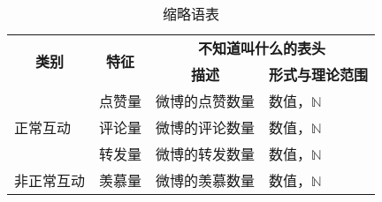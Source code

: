 \documentclass[../main.tex]{subfiles}
\begin{document}

\begin{table}[!htbp]
  \centering
  \begin{tabular}{l|l|l|l}
		\hline
        \multicolumn{1}{c|}{\multirow{2}{*}{\textbf{类别}}} & \multicolumn{1}{c|}{\multirow{2}{*}{\textbf{特征}}} & \multicolumn{2}{c}{\textbf{不知道叫什么的表头}} \\
        \cline{3-4}
         & & \multicolumn{1}{c|}{\textbf{描述}} & \multicolumn{1}{c}{\textbf{形式与理论范围}} \\
		\hline
        \multirow{3}{*}{正常互动} & 点赞量 & 微博的点赞数量 & 数值，$\mathbb{N}$ \\
		\cline{2-4}
         & 评论量 & 微博的评论数量 & 数值，$\mathbb{N}$ \\
		\cline{2-4}
         & 转发量 & 微博的转发数量 & 数值，$\mathbb{N}$ \\
		\hline
        非正常互动 & 羡慕量 & 微博的羡慕数量 & 数值，$\mathbb{N}$ \\
    \hline
  \end{tabular}
  \renewcommand{\arraystretch}{1.38}%
  \setlength{\abovecaptionskip}{0pt}%
  \setlength{\belowcaptionskip}{10pt}%
  \caption{缩略语表}
  \label{tab:1}
\end{table}
\end{document}
